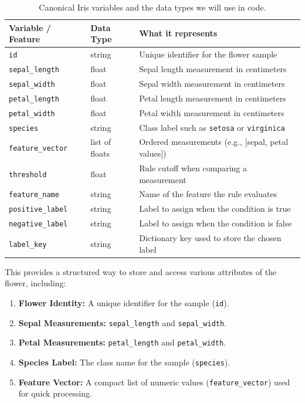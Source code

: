 \begin{table}[H]
    \centering
    \begin{tabular}{|p{}|p{}|p{}|}
        \hline
        \textbf{Variable / Feature} & \textbf{Data Type} & \textbf{What it represents} \\
        \hline
        \texttt{id} & string & Unique identifier for the flower sample \\
        \texttt{sepal\_length} & float & Sepal length measurement in centimeters \\
        \texttt{sepal\_width} & float & Sepal width measurement in centimeters \\
        \texttt{petal\_length} & float & Petal length measurement in centimeters \\
        \texttt{petal\_width} & float & Petal width measurement in centimeters \\
        \texttt{species} & string & Class label such as \texttt{setosa} or \texttt{virginica} \\
        \texttt{feature\_vector} & list of floats & Ordered measurements (e.g., [sepal, petal values]) \\
        \texttt{threshold} & float & Rule cutoff when comparing a measurement \\
        \texttt{feature\_name} & string & Name of the feature the rule evaluates \\
        \texttt{positive\_label} & string & Label to assign when the condition is true \\
        \texttt{negative\_label} & string & Label to assign when the condition is false \\
        \texttt{label\_key} & string & Dictionary key used to store the chosen label \\
        \hline
    \end{tabular}
    \caption{Canonical Iris variables and the data types we will use in code.}
\end{table}

This provides a structured way to store and access various attributes of the flower, including:

\begin{enumerate}
    \item \textbf{Flower Identity:} A unique identifier for the sample (\texttt{id}).
    \item \textbf{Sepal Measurements:} \texttt{sepal\_length} and \texttt{sepal\_width}.
    \item \textbf{Petal Measurements:} \texttt{petal\_length} and \texttt{petal\_width}.
    \item \textbf{Species Label:} The class name for the sample (\texttt{species}).
    \item \textbf{Feature Vector:} A compact list of numeric values (\texttt{feature\_vector}) used for quick processing.
\end{enumerate}


